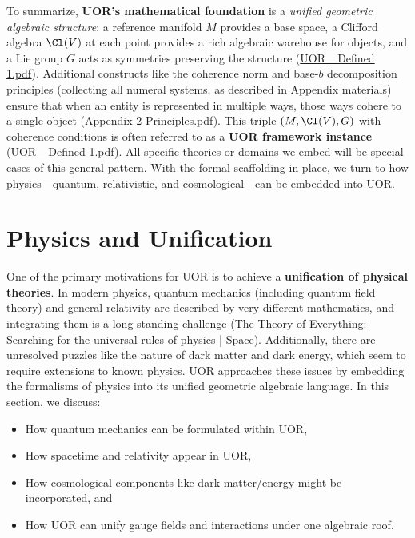 \documentclass[12pt]{article}
\begin{document}
To summarize, \textbf{UOR’s mathematical foundation} is a \emph{unified geometric algebraic structure}: a reference manifold $M$ provides a base space, a Clifford algebra $\Cl(V)$ at each point provides a rich algebraic warehouse for objects, and a Lie group $G$ acts as symmetries preserving the structure (\href{file://file-XiorGa5Wu6KTrCZGytuVSc#:~:text=reference%20manifold%20with%20a%20Clifford,measuring%20the%20size%20of%20Clifford}{UOR\_ Defined 1.pdf}). Additional constructs like the coherence norm and base-$b$ decomposition principles (collecting all numeral systems, as described in Appendix materials) ensure that when an entity is represented in multiple ways, those ways cohere to a single object (\href{file://file-KHyFhnFGcNX7Hyf3H7G9jk#:~:text=its%20possible%20expansions,ensure%20the%20expansions%20cohere%20to}{Appendix-2-Principles.pdf}). This triple $(M, \Cl(V), G)$ with coherence conditions is often referred to as a \textbf{UOR framework instance} (\href{file://file-XiorGa5Wu6KTrCZGytuVSc#:~:text=match%20at%20L806%20Conjecture%20,adjoint%20operator%20%24H%3A%5Cmathcal%7BH%7D%5Cto%5Cmathcal%7BH%7D%24%20such%20that}{UOR\_ Defined 1.pdf}). All specific theories or domains we embed will be special cases of this general pattern. With the formal scaffolding in place, we turn to how physics---quantum, relativistic, and cosmological---can be embedded into UOR.

\section{Physics and Unification}

One of the primary motivations for UOR is to achieve a \textbf{unification of physical theories}. In modern physics, quantum mechanics (including quantum field theory) and general relativity are described by very different mathematics, and integrating them is a long-standing challenge (\href{https://www.space.com/theory-of-everything-definition.html#:~:text=The%20Theory%20of%20Everything%20is,challenge%20for%20over%20a%20century}{The Theory of Everything: Searching for the universal rules of physics | Space}). Additionally, there are unresolved puzzles like the nature of dark matter and dark energy, which seem to require extensions to known physics. UOR approaches these issues by embedding the formalisms of physics into its unified geometric algebraic language. In this section, we discuss: 
\begin{itemize}[leftmargin=*, label={--}]
    \item How quantum mechanics can be formulated within UOR,
    \item How spacetime and relativity appear in UOR,
    \item How cosmological components like dark matter/energy might be incorporated, and
    \item How UOR can unify gauge fields and interactions under one algebraic roof.
\end{itemize}
\end{document}
